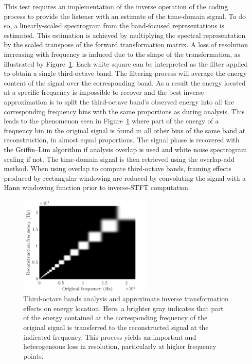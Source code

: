 \documentclass[sensors,article,accept,moreauthors,pdftex,10pt,a4paper]{mdpi}
\begin{document}
This test requires an implementation of the inverse operation of the coding process to provide the listener with an estimate of the time-domain signal. To do so, a linearly-scaled spectrogram from the band-focused representations is estimated. This estimation is achieved by multiplying the spectral representation by the scaled transpose of the forward transformation matrix. A loss of resolution increasing with frequency is induced due to the shape of the transformation, as illustrated by Figure~\ref{fig:freq}. Each white square can be interpreted as the filter applied to obtain a single third-octave band. The filtering process will average the energy content of the signal over the corresponding band. As a result the energy located at a specific frequency is impossible to recover and the best inverse approximation is to split the third-octave band's observed energy into all the corresponding frequency bins with the same proportions as during analysis. This leads to the phenomenon seen {in} Figure~\ref{fig:freq} where part of the energy of a frequency bin in the original signal is found in all other bins of the same band at reconstruction, in almost equal proportions. The signal phase is recovered with the {Griffin--Lim} algorithm \cite{griffin1984} if analysis overlap is used and white noise spectrogram scaling if not. The time-domain signal is then retrieved using the overlap-add method. When using overlap to compute third-octave bands, framing effects produced by rectangular windowing are reduced by convoluting the signal with a Hann windowing function prior to inverse-STFT computation.


\begin{figure}[H]
	\centering
		\includegraphics[width=0.6\textwidth]{figures/freq.png}
	\caption{Third-octave bands analysis and approximate inverse transformation effects on energy location. {Here,} a brighter gray indicates that part of the energy contained at the corresponding frequency of the original signal is transferred to the reconstructed signal at the indicated frequency. This process yields an important and heterogeneous loss in resolution, particularly at higher frequency points.}
	\label{fig:freq}
\end{figure}
\end{document}

